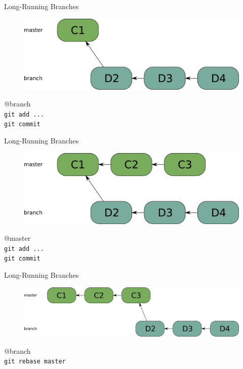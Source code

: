 \begin{frame}{Long-Running Branches}
\begin{figure} 
\centering
  \includegraphics[scale=0.5]{images/long-running-branch.pdf}
\end{figure}
\begin{tiny}
\pause @branch \\
\pause \texttt{git add ...} \\
\pause \texttt{git commit} \\
\end{tiny}
\end{frame}

\begin{frame}{Long-Running Branches}
\begin{figure} 
\centering
  \includegraphics[scale=0.5]{images/long-running-branch2.pdf}
\end{figure}
\begin{tiny}
\pause @master \\
\pause \texttt{git add ...} \\
\pause \texttt{git commit} \\
\end{tiny}

\end{frame}

\begin{frame}{Long-Running Branches}
\begin{figure} 
\centering
  \includegraphics[scale=0.4]{images/long-running-branch3.pdf}
\end{figure}
\begin{tiny}
\pause @branch \\
\pause \texttt{git rebase master} \\
\end{tiny}

\end{frame}


